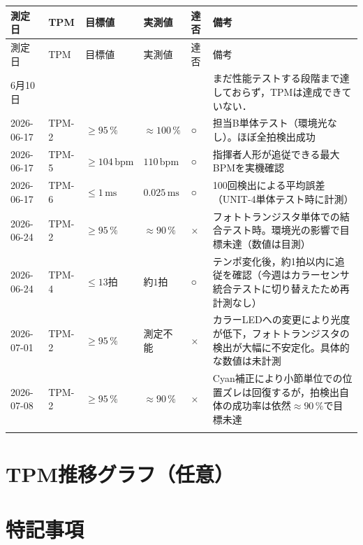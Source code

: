 \begin{longtable}{p{2cm}p{1.5cm}p{2.5cm}p{2.5cm}p{1.5cm}p{4cm}}
\toprule
測定日 & TPM & 目標値 & 実測値 & 達否 & 備考 \\
\midrule
\endfirsthead

\toprule
測定日 & TPM & 目標値 & 実測値 & 達否 & 備考 \\
6月10日 & & & & & まだ性能テストする段階まで達しておらず，TPMは達成できていない．\\
\midrule
\endhead

2026-06-17 & TPM-2 & $\geq 95\,\%$ & ${\approx}100\,\%$ & ○ & 担当B単体テスト（環境光なし）。ほぼ全拍検出成功 \\
2026-06-17 & TPM-5 & $\geq 104\,\mathrm{bpm}$ & $110\,\mathrm{bpm}$ & ○ & 指揮者人形が追従できる最大BPMを実機確認 \\
2026-06-17 & TPM-6 & $\leq 1\,\mathrm{ms}$ & $0.025\,\mathrm{ms}$ & ○ & 100回検出による平均誤差（UNIT-4単体テスト時に計測） \\
2026-06-24 & TPM-2 & $\geq 95\,\%$ & ${\approx}90\,\%$ & × & フォトトランジスタ単体での結合テスト時。環境光の影響で目標未達（数値は目測） \\
2026-06-24 & TPM-4 & $\leq 13$拍 & 約$1$拍 & ○ & テンポ変化後，約1拍以内に追従を確認（今週はカラーセンサ統合テストに切り替えたため再計測なし） \\
2026-07-01 & TPM-2 & $\geq 95\,\%$ & 測定不能 & × & カラーLEDへの変更により光度が低下，フォトトランジスタの検出が大幅に不安定化。具体的な数値は未計測 \\
2026-07-08 & TPM-2 & $\geq 95\,\%$ & ${\approx}90\,\%$ & × & Cyan補正により小節単位での位置ズレは回復するが，拍検出自体の成功率は依然${\approx}90\,\%$で目標未達 \\

\bottomrule
\endfoot
\end{longtable}

\section{TPM推移グラフ（任意）}

%

\section{特記事項}

